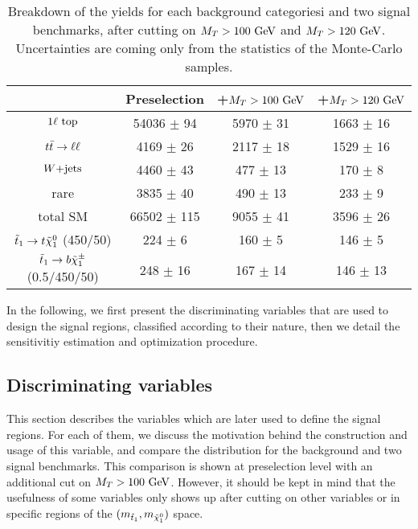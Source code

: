     \begin{table}[h!]
        \centering
        \begin{tabular}{|c|ccc|}
            \hline
                          & Preselection       & +$M_T > 100 ~\text{GeV}$   & +$M_T > 120 ~\text{GeV}$     \\
            \hline
        $1\ell~\text{top}$   & 54036 $\pm$ 94     &  5970 $\pm$ 31      &  1663 $\pm$ 16       \\
        $t\bar{t} \rightarrow \ell \ell$    &  4169 $\pm$ 26     &  2117 $\pm$ 18      &  1529 $\pm$ 16       \\
        $\text{$W$+jets}$          &  4460 $\pm$ 43     &   477 $\pm$ 13      &   170 $\pm$ 8        \\
        rare              &  3835 $\pm$ 40     &   490 $\pm$ 13      &   233 $\pm$ 9        \\
            \hline
        total SM          & 66502 $\pm$ 115    &  9055 $\pm$ 41      &  3596 $\pm$ 26       \\
            \hline
$\tilde{t}_1 \rightarrow t \tilde{\chi}_1^0$   (450/50) & 224 $\pm$ 6         & 160 $\pm$ 5   & 146 $\pm$ 5   \\
$\tilde{t}_1 \rightarrow b \tilde{\chi}_1^\pm$ (0.5/450/50) & 248 $\pm$ 16        & 167 $\pm$ 14  & 146 $\pm$ 13  \\
            \hline
        \end{tabular}
        \caption{Breakdown of the yields for each background categoriesi and two signal
        benchmarks, after cutting on $M_T > 100 ~\text{GeV}$ and $M_T > 120 ~\text{GeV}$. Uncertainties
        are coming only from the statistics of the Monte-Carlo samples.}
        \label{tab:MTcutImpact}
    \end{table}

    In the following, we first present the discriminating variables that are used to design
    the signal regions, classified according to their nature, then we detail the
    sensitivitiy estimation and optimization procedure.

    \subsection{Discriminating variables \label{sec:analysis_variables}}

        This section describes the variables which are later used to define the
        signal regions. For each of them, we discuss the motivation behind the construction
        and usage of this variable, and compare the distribution for the background
        and two signal benchmarks. This comparison is shown at preselection level with
        an additional cut on $M_T > 100~\text{GeV}$. However, it should be kept in mind that the
        usefulness of some variables only shows up after cutting on other variables or in
        specific regions of the $(m_{\tilde{t}_1},m_{\tilde{\chi}_1^0})$ space.

